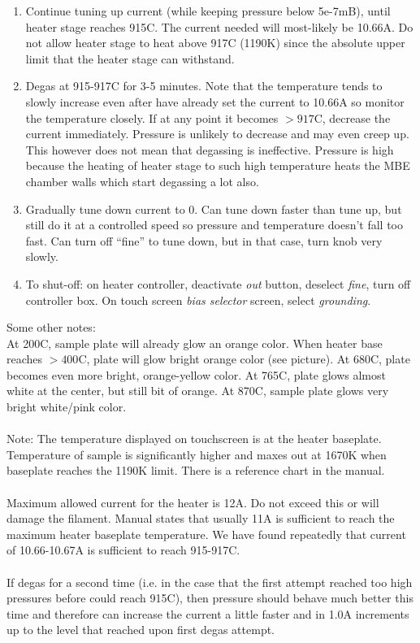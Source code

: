\begin{enumerate}
\item	Continue tuning up current (while keeping pressure below 5e-7mB), until heater stage reaches 915C. The current needed will most-likely be 10.66A. Do not allow heater stage to heat above 917C (1190K) since the absolute upper limit that the heater stage can withstand. 
\item	Degas at 915-917C for 3-5 minutes. Note that the temperature tends to slowly increase even after have already set the current to 10.66A so monitor the temperature closely. If at any point it becomes $>917$C, decrease the current immediately. Pressure is unlikely to decrease and may even creep up. This however does not mean that degassing is ineffective. Pressure is high because the heating of heater stage to such high temperature heats the MBE chamber walls which start degassing a lot also.
\item	Gradually tune down current to 0. Can tune down faster than tune up, but still do it at a controlled speed so pressure and temperature doesn’t fall too fast. Can turn off “fine” to tune down, but in that case, turn knob very slowly.
\item	To shut-off: on heater controller, deactivate \emph{out} button, deselect \emph{fine}, turn off controller box. On touch screen \emph{bias selector} screen, select \emph{grounding}.
\end{enumerate}
Some other notes:\\
At 200C, sample plate will already glow an orange color. When heater base reaches $>400$C, plate will glow bright orange color (see picture). At 680C, plate becomes even more bright, orange-yellow color. At 765C, plate glows almost white at the center, but still bit of orange. At 870C, sample plate glows very bright white/pink color.\\\\
Note: The temperature displayed on touchscreen is at the heater baseplate. Temperature of sample is significantly higher and maxes out at 1670K when baseplate reaches the 1190K limit. There is a reference chart in the manual.\\\\
Maximum allowed current for the heater is 12A. Do not exceed this or will damage the filament. Manual states that usually 11A is sufficient to reach the maximum heater baseplate temperature. We have found repeatedly that current of 10.66-10.67A is sufficient to reach 915-917C.\\\\
If degas for a second time (i.e. in the case that the first attempt reached too high pressures before could reach 915C), then pressure should behave much better this time and therefore can increase the current a little faster and in 1.0A increments up to the level that reached upon first degas attempt.


